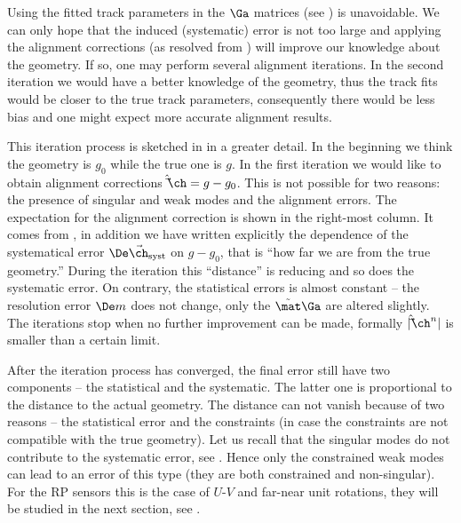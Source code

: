Using the fitted track parameters in the $\Ga$ matrices (see ) is unavoidable. We can only hope that the induced (systematic) error is not too large and applying the alignment corrections (as resolved from ) will improve our knowledge about the geometry. If so, one may perform several alignment iterations. In the second iteration we would have a better knowledge of the geometry, thus the track fits would be closer to the true track parameters, consequently there would be less bias and one might expect more accurate alignment results.

This iteration process is sketched in  in a greater detail. In the beginning we think the geometry is $g_0$ while the true one is $g$. In the first iteration we would like to obtain alignment corrections $\hat\vec\ch = g - g_0$. This is not possible for two reasons: the presence of singular and weak modes and the alignment errors. The expectation for the alignment correction is shown in the right-most column. It comes from , in addition we have written explicitly the dependence of the systematical error $\De\vec\ch_{\rm syst}$ on $g - g_0$, that is ``how far we are from the true geometry.'' During the iteration this ``distance'' is reducing and so does the systematic error. On contrary, the statistical errors is almost constant -- the resolution error $\De m$ does not change, only the $\tilde\mat\Ga$ are altered slightly. The iterations stop when no further improvement can be made, formally $|\hat\vec\ch^n|$ is smaller than a certain limit.


After the iteration process has converged, the final error still have two components -- the statistical and the systematic. The latter one is proportional to the distance to the actual geometry. The distance can not vanish because of two reasons -- the statistical error and the constraints (in case the constraints are not compatible with the true geometry). Let us recall that the singular modes do not contribute to the systematic error, see . Hence only the constrained weak modes can lead to an error of this type (they are both constrained and non-singular). For the RP sensors this is the case of $U$-$V$ and far-near unit rotations, they will be studied in the next section, see .

